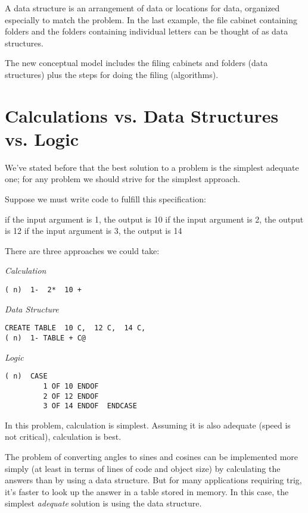 A data structure is an arrangement of data or locations for data,
organized especially to match the problem. In the last example, the file
cabinet containing folders and the folders containing individual letters
can be thought of as data structures.

The new conceptual model includes the filing cabinets and folders
(data structures) plus the steps for doing the filing (algorithms).

\section{Calculations vs. Data Structures vs. Logic}

We've stated before that the best solution to a problem is the simplest
adequate one; for any problem we should strive for the simplest
approach.

Suppose we must write code to fulfill this specification:

if the input argument is 1, the output is 10
if the input argument is 2, the output is 12
if the input argument is 3, the output is 14

There are three approaches we could take:

\emph{Calculation}

\begin{verbatim}
( n)  1-  2*  10 +
\end{verbatim}

\emph{Data Structure}

\begin{verbatim}
CREATE TABLE  10 C,  12 C,  14 C,
( n)  1- TABLE + C@
\end{verbatim}

\emph{Logic}

\begin{verbatim}
( n)  CASE
         1 OF 10 ENDOF
         2 OF 12 ENDOF
         3 OF 14 ENDOF  ENDCASE
\end{verbatim}

In this problem, calculation is simplest. Assuming it is also adequate
(speed is not critical), calculation is best.

The problem of converting angles to sines and cosines can be implemented
more simply (at least in terms of lines of code and object size)
by calculating the answers than by using a data structure. But for many
applications requiring trig, it's faster to look up the answer in a table
stored in memory. In this case, the simplest \emph{adequate} solution is using
the data structure.

